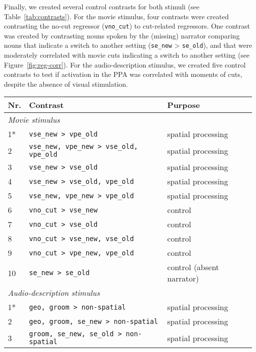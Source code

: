 \documentclass[english,11pt]{article}
\begin{document}
Finally, we created several control contrasts for both stimuli
(see Table~\ref{tab:contrasts}).
For the movie stimulus, four contrasts were created contrasting the no-cut
regressor (\texttt{vno\_cut}) to cut-related regressors.
One contrast was created by contrasting nouns spoken by the (missing) narrator
comparing nouns
%
that indicate a switch to another setting (\texttt{se\_new} >
\texttt{se\_old}), and
%
that were moderately correlated with movie cuts indicating a
switch to another setting (see Figure~\ref{fig:reg-corr}).
For the audio-description stimulus, we created five control contrasts to test if
activation in the PPA was correlated with moments of cuts, despite the absence
of visual stimulation.

\begin{table*}[tbp]
  \caption{Computed contrasts for the analysis of the movie and the audio
    description, and their respective purpose.
    The primary contrasts are marked with an asterisk.
    \texttt{non-spatial} refers to the event categories
    \texttt{body}, \texttt{bodypart}, \texttt{fahead},
    \texttt{object}, \texttt{sex\_f}, \texttt{sex\_m}.
    An explanation of all event categories can be found in
    Table~\ref{tab:events}.
    }
\label{tab:contrasts}
\begin{tabular}{lll}
\toprule
\textbf{Nr.} &  \textbf{Contrast} & \textbf{Purpose} \\
\midrule
\multicolumn{3}{l}{\textit{Movie stimulus}}\\
1* & \texttt{vse\_new > vpe\_old} & spatial processing \tabularnewline
2 & \texttt{vse\_new, vpe\_new > vse\_old, vpe\_old} & spatial processing \tabularnewline
3 & \texttt{vse\_new > vse\_old} & spatial processing \tabularnewline
4 & \texttt{vse\_new > vse\_old, vpe\_old} & spatial processing \tabularnewline
5 & \texttt{vse\_new, vpe\_new > vpe\_old} & spatial processing \tabularnewline
6 & \texttt{vno\_cut > vse\_new} & control \tabularnewline
7 & \texttt{vno\_cut > vse\_old} & control \tabularnewline
8 & \texttt{vno\_cut > vse\_new, vse\_old} & control \tabularnewline
9 & \texttt{vno\_cut > vpe\_new, vpe\_old} & control \tabularnewline
    10 & \texttt{se\_new > se\_old} & control (absent narrator) \tabularnewline
\midrule
\multicolumn{3}{l}{\textit{Audio-description stimulus}}\\
1* & \texttt{geo, groom > non-spatial} & spatial processing \tabularnewline
2 & \texttt{geo, groom, se\_new > non-spatial} & spatial processing \tabularnewline
3 & \texttt{groom, se\_new, se\_old > non-spatial}  & spatial processing \tabularnewline

\end{tabular}
\end{table*}
\end{document}
